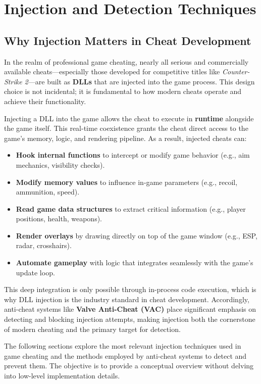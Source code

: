 \chapter{Injection and Detection Techniques}

\section{Why Injection Matters in Cheat Development}

In the realm of professional game cheating, nearly all serious and commercially available cheats—especially those developed for competitive titles like \textit{Counter-Strike 2}—are built as \textbf{DLLs} that are injected into the game process. This design choice is not incidental; it is fundamental to how modern cheats operate and achieve their functionality.

Injecting a DLL into the game allows the cheat to execute in \textbf{runtime} alongside the game itself. This real-time coexistence grants the cheat direct access to the game's memory, logic, and rendering pipeline. As a result, injected cheats can:

\begin{itemize}
    \item \textbf{Hook internal functions} to intercept or modify game behavior (e.g., aim mechanics, visibility checks).
    \item \textbf{Modify memory values} to influence in-game parameters (e.g., recoil, ammunition, speed).
    \item \textbf{Read game data structures} to extract critical information (e.g., player positions, health, weapons).
    \item \textbf{Render overlays} by drawing directly on top of the game window (e.g., ESP, radar, crosshairs).
    \item \textbf{Automate gameplay} with logic that integrates seamlessly with the game's update loop.
\end{itemize}

This deep integration is only possible through in-process code execution, which is why DLL injection is the industry standard in cheat development. Accordingly, anti-cheat systems like \textbf{Valve Anti-Cheat (VAC)} place significant emphasis on detecting and blocking injection attempts, making injection both the cornerstone of modern cheating and the primary target for detection.

The following sections explore the most relevant injection techniques used in game cheating and the methods employed by anti-cheat systems to detect and prevent them. The objective is to provide a conceptual overview without delving into low-level implementation details.


